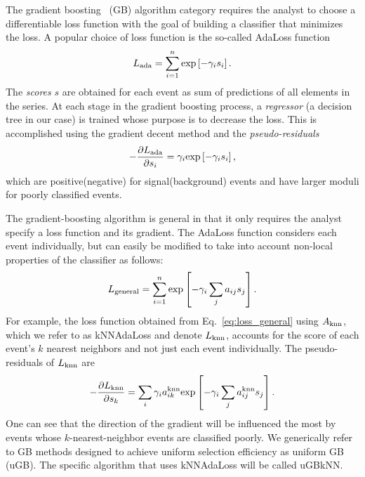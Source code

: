 The gradient boosting~\cite{ref:F1999} (GB) algorithm category requires the analyst to choose a differentiable loss function with the goal of building a classifier that minimizes the loss.  
A popular choice of loss function is the so-called AdaLoss function 
\begin{equation}
L_{\rm ada} = \sum\limits_{i=1}^{n} {\rm exp}\left[-\gamma_i s_i\right]. 
\end{equation}
The {\em scores} $s$ are obtained for each event as sum of predictions of all elements in the series. 
At each stage in the gradient boosting process, a {\em regressor} (a decision tree in our case) is trained whose purpose is to decrease the loss.  This is accomplished using the gradient decent method and the {\em pseudo-residuals}
\begin{equation}
  -\frac{\partial L_{\rm ada}}{\partial s_i} = \gamma_i  {\rm exp}\left[-\gamma_i s_i\right],
\end{equation}
which are positive(negative) for signal(background) events and have larger moduli for poorly classified events.  

The gradient-boosting algorithm is general in that it only requires the analyst specify a loss function and its gradient.  The AdaLoss function considers each event individually, but can easily be modified to take into account non-local properties of the classifier as follows:
\begin{equation}
  \label{eq:loss_general}
  L_{\rm general} = \sum\limits_{i=1}^{n} {\rm exp}\left[-\gamma_i \sum\limits_{j} a_{ij} s_j \right]. 
\end{equation} 
For example, the loss function obtained from Eq.~\ref{eq:loss_general} using $A_{\rm knn}$, which we refer to as kNNAdaLoss and denote $L_{\rm knn}$, accounts for the score of each event's $k$ nearest neighbors and not just each event individually.
The pseudo-residuals of $L_{\rm knn}$ are 
\begin{equation}
  -\frac{\partial L_{\rm knn}}{\partial s_k} = \sum\limits_i \gamma_i a_{ik}^{\rm knn} {\rm exp}\left[-\gamma_i \sum_j a_{ij}^{\rm knn} s_j \right].
\end{equation}
One can see that the direction of the gradient will be influenced the most by events whose $k$-nearest-neighbor events are classified poorly. 
We generically refer to GB methods designed to achieve uniform selection efficiency as uniform GB (uGB).  The specific algorithm that uses kNNAdaLoss will be called uGBkNN.  

